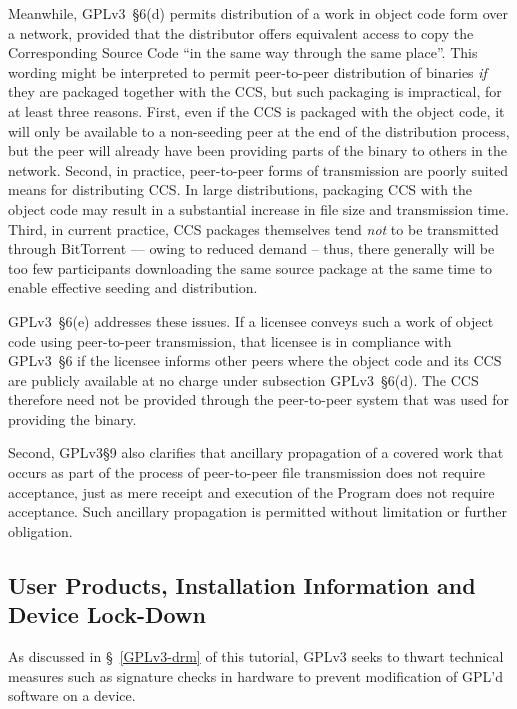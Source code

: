 Meanwhile, GPLv3~\S6(d) permits distribution of a work in object code form
over a network, provided that the distributor offers equivalent access to
copy the Corresponding Source Code ``in the same way through the same
place''.  This wording might be interpreted to permit peer-to-peer
distribution of binaries \textit{if} they are packaged together with the CCS,
but such packaging is impractical, for at least three reasons.  First, even if
the CCS is packaged with the object code, it will only be available to a
non-seeding peer at the end of the distribution process, but the peer will
already have been providing parts of the binary to others in the network.
Second, in practice, peer-to-peer forms of transmission are poorly suited
means for distributing CCS.  In large distributions, packaging CCS with the
object code may result in a substantial increase in file size and
transmission time.  Third, in current practice, CCS packages themselves tend
\textit{not} to be transmitted through BitTorrent --- owing to reduced demand
-- thus, there generally will be too few participants downloading the same
source package at the same time to enable effective seeding and distribution.

GPLv3~\S6(e) addresses these issues.  If a licensee conveys such a work of
object code using peer-to-peer transmission, that licensee is in compliance
with GPLv3~\S6 if the licensee informs other peers where the object code and
its CCS are publicly available at no charge under subsection GPLv3~\S6(d).
The CCS therefore need not be provided through the peer-to-peer system that
was used for providing the binary.

Second, GPLv3\S9 also clarifies that ancillary propagation of a covered work
that occurs as part of the process of peer-to-peer file transmission does not
require acceptance, just as mere receipt and execution of the Program does
not require acceptance.  Such ancillary propagation is permitted without
limitation or further obligation.


\subsection{User Products, Installation Information and Device Lock-Down}

As discussed in \S~\ref{GPLv3-drm} of this tutorial, GPLv3 seeks to thwart
technical measures such as signature checks in hardware to prevent
modification of GPL'd software on a device.

